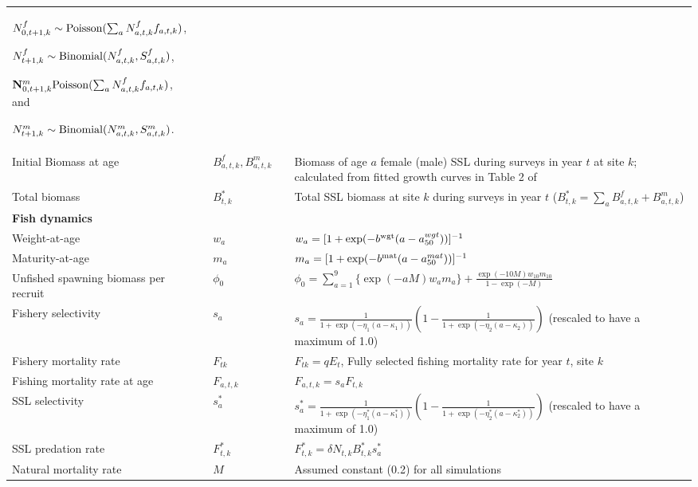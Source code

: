 \documentclass[nonumbib,leqno]{nrc1}
\begin{document}
\begin{longtable}{p{4cm}lll p{8cm}}
$N_{0,t+1,k}^f \sim {\rm Poisson}(\sum_a N_{a,t,k}^ff_{a,t,k})$,

$N_{t+1,k}^f \sim {\rm Binomial}(N_{a,t,k}^f,S_{a,t,k}^f)$,

${\bf N}_{0,t+1,k}^{m} {\rm Poisson}(\sum_a N_{a,t,k}^f f_{a,t,k})$, and

$N_{t+1,k}^{m} \sim {\rm Binomial}(N_{a,t,k}^{m},S_{a,t,k}^{m})$. \\
Initial
Biomass at age & & $B_{a,t,k}^f,B_{a,t,k}^{m}$ & & Biomass of age $a$ female (male) SSL during surveys in year $t$ at site $k$; calculated from fitted growth curves in Table 2 of \citet{WinshipEtAl2001}\\
Total biomass & & $B_{t,k}^*$ & & Total SSL biomass at site $k$ during surveys in year $t$ ($B_{t,k}^*=\sum_a B_{a,t,k}^f+B_{a,t,k}^{m}$) \\
\midrule
\multicolumn{1}{l}{\textbf{Fish dynamics}}\\
Weight-at-age & & $w_a$ & & $w_a = [ 1 + \exp(-b^{\rm wgt}(a-a_{50}^{wgt})) ]^{-1}$ \\
Maturity-at-age & & $m_a$ & & $m_a = [ 1 + \exp(-b^{\rm mat}(a-a_{50}^{mat})) ]^{-1}$ \\
Unfished spawning biomass per recruit & & $\phi_0$ & & $\phi_0=\sum_{a=1}^9 \{ \exp(-aM) w_a m_a \} + \frac{\exp(-10M) w_{10} m_{10}}{1-\exp(-M)}$ \\

Fishery selectivity  & & $s_a$ & &  $s_a = \frac{1}{1+\exp(-\eta_1(a-\kappa_1))} \left( 1- \frac{1}{1+\exp(-\eta_2(a-\kappa_2))} \right)$ (rescaled to have a maximum of 1.0)\\

Fishery mortality rate & & $F_{tk}$ & & $F_{tk}=q E_t$, Fully selected fishing mortality rate for year $t$, site $k$\\

Fishing mortality rate at age & & $F_{a,t,k}$ & & $F_{a,t,k}=s_a F_{t,k}$ \\

SSL selectivity  & & $s_a^*$ & &  $s_a^* = \frac{1}{1+\exp(-\eta_1^*(a-\kappa_1^*))} \left( 1- \frac{1}{1+\exp(-\eta_2^*(a-\kappa_2^*))} \right)$ (rescaled to have a maximum of 1.0)\\

SSL predation rate  & & $F_{t,k}^*$ & & $F_{t,k}^*=\delta N_{t,k} B_{t,k}^* s_a^*$ \\

Natural mortality rate & & $M$ & & Assumed constant (0.2) for all simulations \\


\end{longtable}
\end{document}
